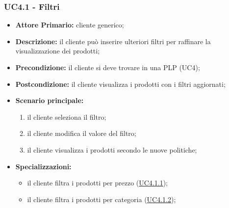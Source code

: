 \subsubsection{UC4.1 - Filtri}
\label{UC4.1}
\begin{itemize}
    \item \textbf{Attore Primario:} cliente generico;
    \item \textbf{Descrizione:} il cliente può inserire ulteriori filtri per raffinare la visualizzazione dei prodotti;
    \item \textbf{Precondizione:} il cliente si deve trovare in una PLP (UC4);
    \item \textbf{Postcondizione:} il cliente visualizza i prodotti con i filtri aggiornati;
    \item \textbf{Scenario principale:}
    \begin{enumerate}
        \item il cliente seleziona il filtro;
        \item il cliente modifica il valore del filtro;
        \item il cliente visualizza i prodotti secondo le nuove politiche; 
    \end{enumerate}
    \item \textbf{Specializzazioni: }
    \begin{itemize}
        \item il cliente filtra i prodotti per prezzo (\hyperref[UC4.1.1]{UC4.1.1});
        \item il cliente filtra i prodotti per categoria (\hyperref[UC4.1.2]{UC4.1.2});
    \end{itemize}
\end{itemize}


